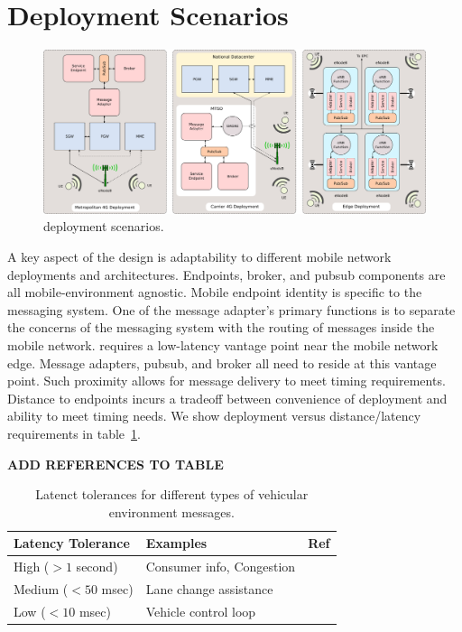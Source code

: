 \section{Deployment Scenarios}
\label{sec:deployments}

\begin{figure}[ht]
  \centering
  \includegraphics[width=\textwidth]{figs/deploy.png}
  \caption{\name deployment scenarios.}
  \label{fig:deployments}
\end{figure}

A key aspect of the \name design is adaptability to different mobile
network deployments and architectures. Endpoints, broker, and pubsub
components are all mobile-environment agnostic. Mobile endpoint
identity is specific to the \name messaging system. One of the message
adapter's primary functions is to separate the concerns of the
messaging system with the routing of messages inside the mobile
network.  \name requires a low-latency vantage point near the mobile
network edge. Message adapters, pubsub, and broker all need to reside
at this vantage point.  Such proximity allows for message delivery to
meet timing requirements.  Distance to endpoints incurs a tradeoff between
convenience of deployment and ability to meet timing needs. We show
deployment versus distance/latency requirements in
table~\ref{tab:lat-req}.

{\bf ADD REFERENCES TO TABLE}

\begin{table}[h]
  \centering
  \begin{tabular}{| l | l | l |}
    \hline
    \textbf{Latency Tolerance} & \textbf{Examples} & \textbf{Ref} \\ \hline \hline
    High ($> 1$ second) & Consumer info, Congestion & \cite{camp2005vehicle,papadimitratos2009vehicular} \\ \hline
    Medium ($< 50$ msec) & Lane change assistance & \cite{FIXME} \\ \hline
    Low ($< 10$ msec) & Vehicle control loop & \cite{hansson2002integrating} \\ \hline
    \hline
  \end{tabular}
  \label{tab:lat-req}
  \caption{Latenct tolerances for different types of vehicular environment messages.}
\end{table}

